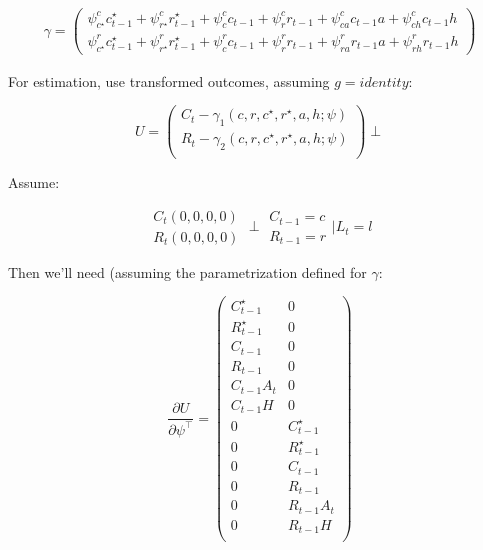 \documentclass[]{article}
\begin{document}
\begin{align*} 
\gamma = 
\begin{pmatrix}
\psi^c_{c^{\star}} c^{\star}_{t-1} + \psi^c_{r^{\star}} r^{\star}_{t-1} + \psi^c_{c} c_{t-1} + \psi^c_{r} r_{t-1} + \psi^c_{ca} c_{t-1} a + \psi^c_{ch} c_{t-1} h \\
\psi^r_{c^{\star}} c^{\star}_{t-1} + \psi^r_{r^{\star}} r^{\star}_{t-1} + \psi^r_{c} c_{t-1} + \psi^r_{r} r_{t-1} + \psi^r_{ra} r_{t-1} a + \psi^r_{rh} r_{t-1} h
\end{pmatrix}
\end{align*}

For estimation, use transformed outcomes, assuming \(g = identity\):

\[
U =
\begin{pmatrix}
C_t  - \gamma_1(c, r, c^{\star}, r^{\star}, a, h; \psi) \\
R_t  - \gamma_2(c, r, c^{\star}, r^{\star}, a, h; \psi) \\
\end{pmatrix} \perp 
\]

Assume:

\[
\begin{array}{c}
C_t(0, 0, 0, 0) \\
R_t(0, 0, 0, 0)
\end{array} \perp 
\begin{array}{c}
C_{t - 1} = c \\
R_{t - 1} = r
\end{array} \bigg| L_t = l
\]

Then we'll need (assuming the parametrization defined for \(\gamma\):

\[
\frac{\partial U}{\partial \psi^{\intercal}} = 
\begin{pmatrix}
C^{\star}_{t-1} & 0  \\
R^{\star}_{t-1} & 0  \\
C_{t-1} & 0 \\
R_{t-1} & 0 \\
C_{t-1} A_t & 0 \\
C_{t-1} H & 0 \\
0 & C^{\star}_{t-1} \\
0 & R^{\star}_{t-1} \\
0 & C_{t-1}  \\
0 & R_{t-1} \\
0 & R_{t-1} A_t  \\
0 & R_{t-1} H   \\
\end{pmatrix}
\]
\end{document}
